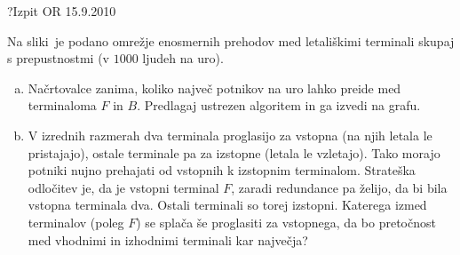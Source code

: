 \begin{naloga}{?}{Izpit OR 15.9.2010}
\begin{vprasanje}
Na sliki~\fig je podano omrežje enosmernih prehodov
med letališkimi terminali skupaj s prepustnostmi (v $1000$ ljudeh na uro).

\begin{enumerate}[(a)]
\item Načrtovalce zanima,
koliko največ potnikov na uro lahko preide med terminaloma $F$ in $B$.
Predlagaj ustrezen algoritem in ga izvedi na grafu.

\item V izrednih razmerah dva terminala proglasijo za vstopna
(na njih letala le pristajajo),
ostale terminale pa za izstopne (letala le vzletajo).
Tako morajo potniki nujno prehajati od vstopnih k izstopnim terminalom.
Strateška odločitev je, da je vstopni terminal $F$,
zaradi redundance pa želijo, da bi bila vstopna terminala dva.
Ostali terminali so torej izstopni.
Katerega izmed terminalov (poleg $F$) se splača še proglasiti za vstopnega,
da bo pretočnost med vhodnimi in izhodnimi terminali kar največja?
\end{enumerate}

\begin{slika}
\pgfslika
{}
\end{slika}
\end{vprasanje}
\begin{odgovor}
\end{odgovor}
\end{naloga}

